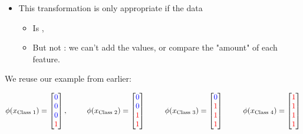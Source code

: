 \begin{definition}
                    \subsecdiv

                    \begin{itemize}
                        \item This transformation is only appropriate if the data 
                            \begin{itemize}
                                \item Is ,
                                \item But not : we can't add the values, or compare the "amount" of each feature.
                            \end{itemize}
                    \end{itemize}
                \end{definition}

                \miniex We reuse our example from earlier: 

                \begin{equation*}
                    \phi(x_{\text{Class 1}}) =
                    \begin{bmatrix}
                        \textcolor{blue}{0} \\ \textcolor{blue}{0} \\ \textcolor{blue}{0} \\ \textcolor{red}{1}
                    \end{bmatrix},
                    \qquad \;\;
                    \phi(x_{\text{Class 2}}) =
                    \begin{bmatrix}
                        \textcolor{blue}{0} \\ \textcolor{blue}{0} \\ \textcolor{red}{1} \\ \textcolor{red}{1}
                    \end{bmatrix}
                    \qquad \;\;
                    \phi(x_{\text{Class 3}}) =
                    \begin{bmatrix}
                        \textcolor{blue}{0} \\ \textcolor{red}{1} \\ \textcolor{red}{1} \\ \textcolor{red}{1}
                    \end{bmatrix}
                    \qquad \;\;
                    \phi(x_{\text{Class 4}}) =
                    \begin{bmatrix}
                        \textcolor{red}{1} \\ \textcolor{red}{1} \\ \textcolor{red}{1} \\ \textcolor{red}{1}
                    \end{bmatrix}
                \end{equation*}

